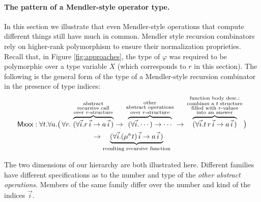 \paragraph{The pattern of a Mendler-style operator type.}
In this section we illustrate that even Mendler-style operations that
compute different things still have much in common.
Mendler style recursion combinators rely on
higher-rank polymorphism to ensure their normalization proprieties. 
Recall that, in Figure \ref{fig:approaches},
the type of $\varphi$ was required to be polymorphic over a type variable
$X$ (which corresponds to $r$ in this section).
The following is the general form of the type of a Mendler-style
recursion combinator in the presence of type indices:
\begin{multline*}
 \textsf{Mxxx} : \forall t . \forall a .
   \big(\, \forall r . \;
      \overset{\begin{smallmatrix}
                        \text{abstract} \\
                        \text{recursive call} \\
                        \text{over $r$-structure}
                       \end{smallmatrix}}{\overbrace{
            (\forall\vec{i} . r\,\vec{i} -> a\,\vec{i}\,) }}
   -> \overset{\begin{smallmatrix}
                        \text{other} \\
                        \text{abstract operations} \\
                        \text{over $r$-structure}
                       \end{smallmatrix}}{\overbrace{
            (\forall\vec{i} . \cdots) -> \cdots }}
   -> \overset{\begin{smallmatrix}
                        \text{function body desc.:} \\
                        \text{combines a $t$ structure}\\
                        \text{filled with $r$-values} \\
                        \text{into an answer}
                       \end{smallmatrix}}{\overbrace{
            (\forall\vec{i} . t\, r\, \vec{i}  -> a\,\vec{i}\,) }}
   \big) \\
 -> \underset{\text{resulting recursive function}}{\underbrace{
       (\forall\vec{i} . (\mu^\kappa t)\,\vec{i} -> a\,\vec{i}\,) }}
\end{multline*}


The two dimensions of our hierarchy are both illustrated here.
Different families have different specifications as to the number and
type of the {\it other abstract operations}. Members of the same family
differ over the number and kind of the indices $\vec{i}$.

